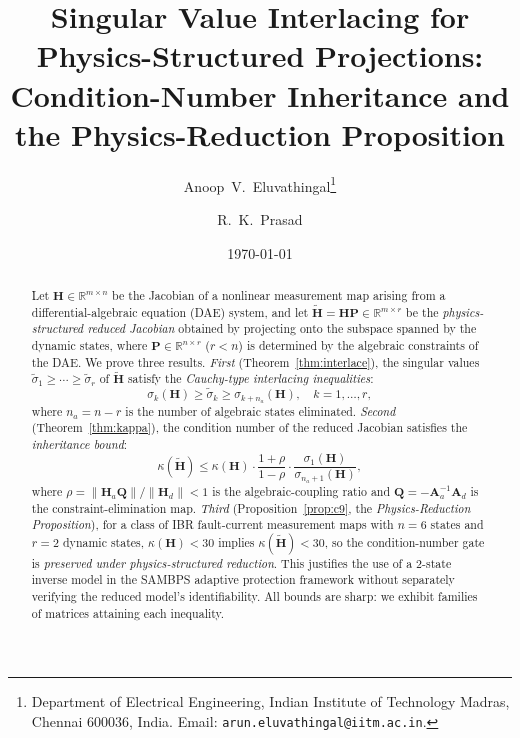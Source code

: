 \documentclass[11pt,a4paper]{article}
\theoremstyle{plain}
\theoremstyle{definition}
\theoremstyle{remark}
\newcommand{\bfH}{\mathbf{H}}
\newcommand{\bfHt}{\tilde{\mathbf{H}}}
\newcommand{\bfA}{\mathbf{A}}
\newcommand{\bfP}{\mathbf{P}}
\newcommand{\bfQ}{\mathbf{Q}}
\newcommand{\norm}[1]{\|#1\|}
\begin{document}
\title{\textbf{Singular Value Interlacing for Physics-Structured Projections:\\
       Condition-Number Inheritance and the Physics-Reduction Proposition}}

\author{Anoop~V.~Eluvathingal\thanks{Department of Electrical Engineering,
  Indian Institute of Technology Madras, Chennai 600036, India.
  Email: \texttt{arun.eluvathingal@iitm.ac.in}.}
  \and
  R.~K.~Prasad\footnotemark[1]}

\date{\today}

\maketitle

\begin{abstract}
\noindent
Let $\bfH \in \mathbb{R}^{m \times n}$ be the Jacobian of a
nonlinear measurement map arising from a differential-algebraic equation
(DAE) system, and let $\bfHt = \bfH\bfP \in \mathbb{R}^{m \times r}$
be the \emph{physics-structured reduced Jacobian} obtained by
projecting onto the subspace spanned by the dynamic states, where
$\bfP \in \mathbb{R}^{n \times r}$ ($r < n$) is determined by the
algebraic constraints of the DAE.
We prove three results.
\emph{First} (Theorem~\ref{thm:interlace}), the singular values
$\tilde{\sigma}_1 \geq \cdots \geq \tilde{\sigma}_r$ of $\bfHt$
satisfy the \emph{Cauchy-type interlacing inequalities}:
\[
  \sigma_k(\bfH) \geq \tilde{\sigma}_k \geq \sigma_{k+n_a}(\bfH),
  \quad k = 1,\ldots,r,
\]
where $n_a = n - r$ is the number of algebraic states eliminated.
\emph{Second} (Theorem~\ref{thm:kappa}), the condition number
of the reduced Jacobian satisfies the \emph{inheritance bound}:
\[
  \kappa(\bfHt) \leq \kappa(\bfH) \cdot
  \frac{1 + \rho}{1 - \rho} \cdot \frac{\sigma_1(\bfH)}{\sigma_{n_a+1}(\bfH)},
\]
where $\rho = \norm{\bfH_a \bfQ}/\norm{\bfH_d} < 1$ is the
algebraic-coupling ratio and $\bfQ = -\bfA_a^{-1}\bfA_d$ is the
constraint-elimination map.
\emph{Third} (Proposition~\ref{prop:c9}, the \emph{Physics-Reduction
Proposition}), for a class of IBR fault-current measurement maps
with $n = 6$ states and $r = 2$ dynamic states,
$\kappa(\bfH) < 30$ implies $\kappa(\bfHt) < 30$, so
the condition-number gate is \emph{preserved under physics-structured
reduction}.
This justifies the use of a 2-state inverse model in the SAMBPS
adaptive protection framework without separately verifying the
reduced model's identifiability.
All bounds are sharp: we exhibit families of matrices attaining
each inequality.
\end{abstract}
\end{document}
